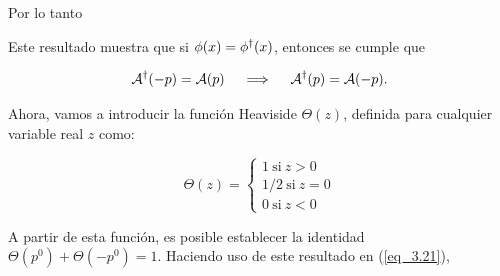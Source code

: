 Por lo tanto


Este resultado muestra que si $\phi(x)=\phi^{\dag}(x)$, entonces se cumple que

\begin{equation}
    \mathcal{A}^{\dagger} (-p) = \mathcal{A}(p) \quad \implies \quad \mathcal{A}^{\dagger} (p) = \mathcal{A}(-p). 
    \label{eq_3.24}
\end{equation}

Ahora, vamos a introducir la función Heaviside $\Theta \left( z\right)$, definida para cualquier variable real $z$ como:

\begin{equation}
    \Theta \left( z\right) =\left\{ \begin{array}{c} 
    1~\text{si}~z>0 \\ 
    1/2~\text{si}~z=0 \\ 
    0~\text{si}~z<0
    \end{array}
    \right.
    \label{eq_3.25}
\end{equation}

A partir de esta función, es posible establecer la identidad $\Theta(p^{0})+\Theta(-p^{0})=1$. Haciendo uso de este resultado en (\ref{eq_3.21}),


